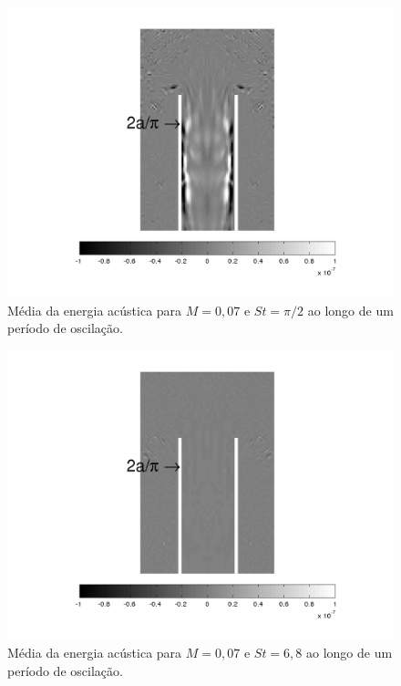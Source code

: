 \begin{figure}[ht!]
\centering
  \includegraphics[width=0.85\linewidth]{figuras/max_007_media.png}
  \caption[Média da energia acústica para $M = 0,07$ e $St = \pi/2$.]{Média da energia acústica para $M = 0,07$ e $St = \pi/2$ ao longo de um período de oscilação.}
  \label{fig:max_007_media}
\end{figure}



\begin{figure}[ht!]
\centering
  \includegraphics[width=0.85\linewidth]{figuras/min_007_media.png}
  \caption[Média da energia acústica para $M = 0,07$ e $St = 6,8$.]{Média da energia acústica para $M = 0,07$ e $St = 6,8$ ao longo de um período de oscilação.}
  \label{fig:min_007_media}
\end{figure}
\vfill
\clearpage

\newpage
\begin{figure}[ht!]
\centering
  
\end{figure}

